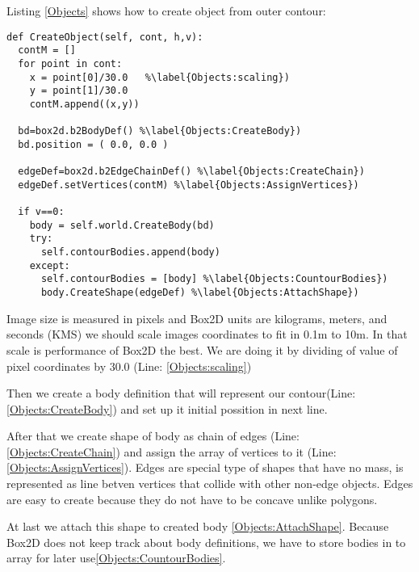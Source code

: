 \documentclass{ifacconf}
\begin{document}
Listing \ref{Objects} shows how to create object from outer contour: 
\begin{lstlisting}[name=Objects,label=Objects,caption=Creation of object from
outer contour]
def CreateObject(self, cont, h,v):
  contM = []
  for point in cont:
    x = point[0]/30.0	%\label{Objects:scaling})
    y = point[1]/30.0
    contM.append((x,y))
    
  bd=box2d.b2BodyDef() %\label{Objects:CreateBody})
  bd.position = ( 0.0, 0.0 )
  
  edgeDef=box2d.b2EdgeChainDef() %\label{Objects:CreateChain})
  edgeDef.setVertices(contM) %\label{Objects:AssignVertices})

  if v==0:
    body = self.world.CreateBody(bd)
    try:
      self.contourBodies.append(body)
    except:
      self.contourBodies = [body] %\label{Objects:CountourBodies})
      body.CreateShape(edgeDef) %\label{Objects:AttachShape})
\end{lstlisting}
Image size is measured in pixels and Box2D units are kilograms, meters,
and seconds (KMS) we should scale images coordinates to fit in 0.1m to
10m. In that scale is performance of Box2D the best. We are doing it by
dividing of value of pixel coordinates by 30.0 (Line: \ref{Objects:scaling})

Then we create a body definition that will represent our contour(Line:
\ref{Objects:CreateBody}) and set up it initial possition in next line.

After that we create shape of body as chain of edges (Line:
\ref{Objects:CreateChain}) and assign the array of vertices to it (Line:
\ref{Objects:AssignVertices}). Edges are special type of shapes that have no
mass, is represented as line betven vertices that collide with other non-edge
objects. Edges are easy to create because they do not have to be concave unlike
polygons.

At last we attach this shape to created body \ref{Objects:AttachShape}. Because
Box2D does not keep track about body definitions, we have to store bodies in to
array for later use\ref{Objects:CountourBodies}.
\end{document}
